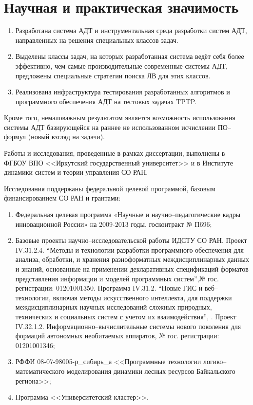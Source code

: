 \section*{Научная и практическая значимость}
\begin{enumerate}
\item Разработана система АДТ и инструментальная среда разработки систем АДТ, направленных на решения специальных классов задач.
\item Выделены классы задач, на которых разработанная система ведёт себя более эффективно, чем самые производительные современные системы АДТ, предложены специальные стратегии поиска ЛВ для этих классов.
\item Реализована инфраструктура тестирования разработанных алгоритмов и программного обеспечения АДТ на тестовых задачах TPTP. %
\end{enumerate}

Кроме того, немаловажным результатом является возможность использования системы АДТ базирующейся на раннее не использованном исчислении ПО--формул (новый взгляд на задачи).

Работы и исследования, проведенные в рамках  диссертации, выполнены в ФГБОУ ВПО <<Иркутский государственный университет>> и в Институте динамики систем и теории управления СО РАН.

Исследования поддержаны федеральной целевой программой, базовым финансированием СО РАН и грантами:
\begin{enumerate}
\item Федеральная целевая программа «Научные и научно--педагогические кадры инновационной России» на 2009-2013 годы, госконтракт № П696;
\item Базовые проекты научно--исследовательской работы ИДСТУ СО РАН. Проект IV.31.2.4. ``Методы и технологии разработки программного обеспечения для анализа, обработки, и хранения разноформатных междисциплинарных данных и знаний, основанные на применении декларативных спецификаций форматов представления информации и моделей программных систем'',№ гос. регистрации: 01201001350. Программа IV.31.2. ``Новые ГИС и веб--технологии, включая методы искусственного интеллекта, для поддержки междисциплинарных научных исследований сложных природных, технических и социальных систем с учетом их взаимодействия'', . Проект IV.32.1.2. Информационно--вычислительные системы нового поколения для формаций автономных необитаемых аппаратов, № гос. регистрации: 01201001346;
\item РФФИ 08-07-98005-р\_сибирь\_а <<Программные технологии логико--математического моделирования динамики лесных ресурсов Байкальского региона>>;
\item Программа <<Университетский кластер>>.
\end{enumerate}

